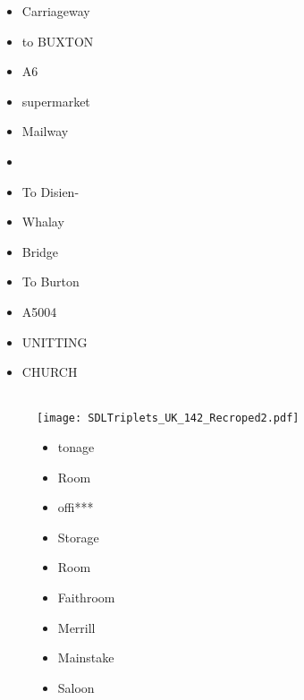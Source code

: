 \documentclass[conference]{IEEEtran}
\begin{document}
\begin{figure*}[th!]
{\begin{minipage}[b]{8cm}
\begin{small}
\begin{itemize}
      \item Carriageway
      \item to BUXTON
      \item A6
      \item supermarket
      \item Mailway
      \item 
      \item To Disien-
      \item Whalay
      \item Bridge
      \item To Burton
      \item A5004
      \item UNITTING
      \item CHURCH
    \end{itemize}
    \end{small}
  \end{minipage}
  }
\end{figure*}

\clearpage

\begin{figure}[th!]
  \\
  \texttt{[image: SDLTriplets\_UK\_142\_Recroped2.pdf]}
  \\
   \label{fig:imgIlus1}
    \begin{small}
    \begin{itemize}
       \item tonage
       \item Room
       \item offi***
       \item Storage
       \item Room
       \item Faithroom
       \item Merrill
       \item Mainstake
       \item Saloon
    \end{itemize}
    \end{small}
\end{figure}












\end{document}
